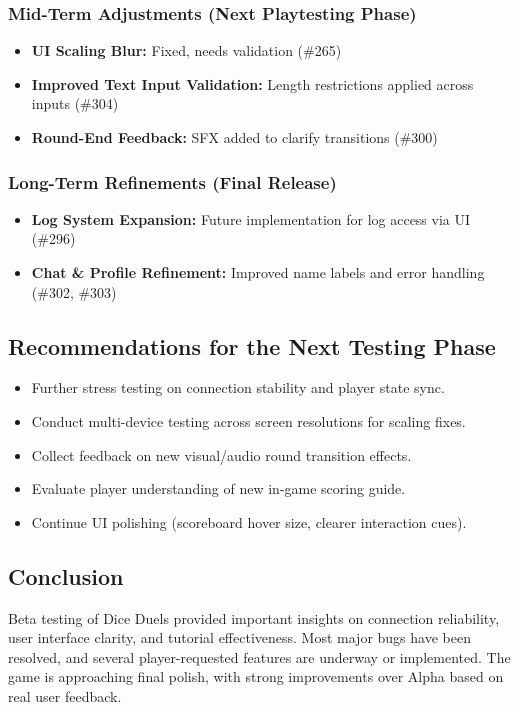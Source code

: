 \documentclass{article}
\begin{document}
\subsubsection{Mid-Term Adjustments (Next Playtesting Phase)}
\begin{itemize}
    \item \textbf{UI Scaling Blur:} Fixed, needs validation (\#265)
    \item \textbf{Improved Text Input Validation:} Length restrictions applied across inputs (\#304)
    \item \textbf{Round-End Feedback:} SFX added to clarify transitions (\#300)
\end{itemize}

\subsubsection{Long-Term Refinements (Final Release)}
\begin{itemize}
    \item \textbf{Log System Expansion:} Future implementation for log access via UI (\#296)
    \item \textbf{Chat \& Profile Refinement:} Improved name labels and error handling (\#302, \#303)
\end{itemize}

\subsection{Recommendations for the Next Testing Phase}
\begin{itemize}
    \item Further stress testing on connection stability and player state sync.
    \item Conduct multi-device testing across screen resolutions for scaling fixes.
    \item Collect feedback on new visual/audio round transition effects.
    \item Evaluate player understanding of new in-game scoring guide.
    \item Continue UI polishing (scoreboard hover size, clearer interaction cues).
\end{itemize}

\subsection{Conclusion}
Beta testing of Dice Duels provided important insights on connection reliability, user interface clarity, and tutorial effectiveness. Most major bugs have been resolved, and several player-requested features are underway or implemented. The game is approaching final polish, with strong improvements over Alpha based on real user feedback.
\end{document}
